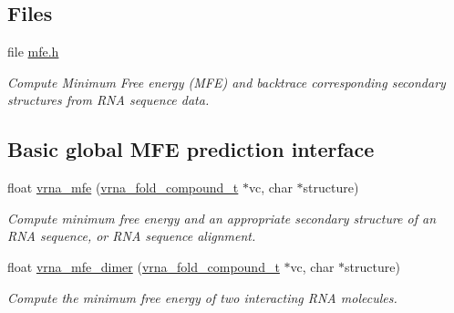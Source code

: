 \subsection*{Files}
\begin{DoxyCompactItemize}
\item 
file \hyperlink{mfe_8h}{mfe.\+h}
\begin{DoxyCompactList}\small\item\em Compute Minimum Free energy (M\+FE) and backtrace corresponding secondary structures from R\+NA sequence data. \end{DoxyCompactList}\end{DoxyCompactItemize}
\subsection*{Basic global M\+FE prediction interface}
\begin{DoxyCompactItemize}
\item 
float \hyperlink{group__mfe__global_gabd3b147371ccf25c577f88bbbaf159fd}{vrna\+\_\+mfe} (\hyperlink{group__fold__compound_ga1b0cef17fd40466cef5968eaeeff6166}{vrna\+\_\+fold\+\_\+compound\+\_\+t} $\ast$vc, char $\ast$structure)
\begin{DoxyCompactList}\small\item\em Compute minimum free energy and an appropriate secondary structure of an R\+NA sequence, or R\+NA sequence alignment. \end{DoxyCompactList}\item 
float \hyperlink{group__mfe__global_gaab22d10c1190f205f16a77cab9d5d3ee}{vrna\+\_\+mfe\+\_\+dimer} (\hyperlink{group__fold__compound_ga1b0cef17fd40466cef5968eaeeff6166}{vrna\+\_\+fold\+\_\+compound\+\_\+t} $\ast$vc, char $\ast$structure)
\begin{DoxyCompactList}\small\item\em Compute the minimum free energy of two interacting R\+NA molecules. \end{DoxyCompactList}\end{DoxyCompactItemize}

